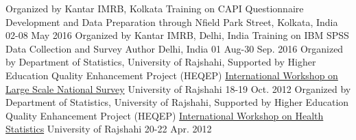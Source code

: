 



\begin{cventries}

  \cventry
    {Organized by Kantar IMRB, Kolkata} %
    {Training on CAPI Questionnaire Development and Data Preparation through Nfield} %
    {Park Street, Kolkata, India} %
    {02-08 May 2016} %
	{}
\vspace{-.5\baselineskip}
  \cventry
    {Organized by Kantar IMRB, Delhi, India} %
     {Training on IBM SPSS Data Collection and Survey Author} %
    {Delhi, India} %
    {01 Aug-30 Sep. 2016} %
    {}
\vspace{-.5\baselineskip}
  \cventry
    {Organized by Department of Statistics, University of Rajshahi, Supported by Higher Education Quality Enhancement Project (HEQEP)} %
     {\href{https://www.dropbox.com/sh/r935yo7botdn9nd/AAD2-oBQcg9RUDTylxJplrW_a?dl=0}{International Workshop on Large Scale National Survey}} %
    {University of Rajshahi} %
    {18-19 Oct. 2012} %
{}
\vspace{-.5\baselineskip}
  \cventry
    {Organized by Department of Statistics, University of Rajshahi, Supported by Higher Education Quality Enhancement Project (HEQEP)} %
     {\href{https://www.dropbox.com/sh/peulp7114qvd2y6/AADHfkLRA8exJW5V_EEmch9qa?dl=0}{International Workshop on Health Statistics}} %
    {University of Rajshahi} %
    {20-22 Apr. 2012} %
{}
\vspace{-.5\baselineskip}
\end{cventries}




